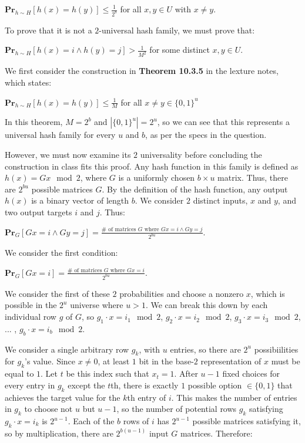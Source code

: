 \documentclass[11pt]{article}
\begin{document}
\begin{enumerate}
$\textbf{Pr}_{h \sim H}[h(x) = h(y)] \leq \frac{1}{2^b}$ for all $x,y \in U$ with $x \neq y$.

To prove that it is not a $2$-universal hash family, we must prove that: 

$\textbf{Pr}_{h \sim H}[h(x) = i \land h(y) = j] > \frac{1}{M^2}$ for some distinct $x, y \in U$. 

We first consider the construction in \textbf{Theorem 10.3.5} in the lexture notes, which states:

$\textbf{Pr}_{h \sim H}[h(x) = h(y)] \leq \frac{1}{M}$ for all $x \neq y \in \{0, 1\}^{u}$

In this theorem, $M = 2^b$ and $|\{0, 1\}^{u}| = 2^{u}$, so we can see that this represents a universal hash family for every $u$ and $b$, 
as per the specs in the question.

However, we must now examine its $2$ universality before concluding the construction in class fits this proof. 
Any hash function in this family is defined as $h(x) = Gx \mod 2$, where $G$ is a uniformly chosen $b \times u$ matrix. 
Thus, there are $2^{bu}$ possible matrices $G$. By the definition of the hash function, any output $h(x)$ is a binary vector of length $b$. 
We consider $2$ distinct inputs, $x$ and $y$, and two output targets $i$ and $j$. Thus: 

$\textbf{Pr}_{G}[Gx = i \land Gy = j] = \frac{\# \text{ of matrices } G \text{ where } Gx = i \land Gy = j}{2^{bu}}$. 

We consider the first condition: 

$\textbf{Pr}_{G}[Gx = i] = \frac{\# \text{ of matrices } G \text{ where } Gx = i}{2^{bu}}$. 

We consider the first of these $2$ probabilities and choose a nonzero $x$, which is possible in the $2^{u}$ universe where $u > 1$. 
We can break this down by each individual row $g$ of $G$, so $g_1 \cdot x = i_1 \mod 2$, $g_2 \cdot x = i_2 \mod 2$, 
$g_3 \cdot x = i_3 \mod 2$, ... , $g_b \cdot x = i_b \mod 2$. 

We consider a single arbitrary row $g_k$, with $u$ entries, so there are $2^u$ possibiilities for $g_k$'s value. 
Since $x \neq 0$, at least $1$ bit in the base-$2$ representation of $x$ must be equal to $1$. 
Let $t$ be this index such that $x_t = 1$. After $u-1$ fixed choices for every entry in $g_k$ except the $t$th, 
there is exactly $1$ possible option $\in \{0, 1\}$ that achieves the target value for the $k$th entry of $i$. 
This makes the number of entries in $g_k$ to choose not $u$ but $u-1$, so the number of potential rows $g_k$ satisfying $g_k \cdot x = i_k$ is $2^{u-1}$. 
Each of the $b$ rows of $i$ has $2^{u-1}$ possible matrices satisfying it, so by multiplication, there are $2^{b(u-1)}$ input $G$ matrices. Therefore: 


\end{enumerate}
\end{document}
